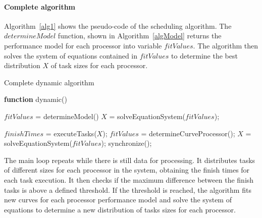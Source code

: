 \documentclass[journal]{IEEEtran}
\begin{document}
\vspace{0.2cm}
\paragraph*{Complete algorithm} 

Algorithm~\ref{alg1} shows the pseudo-code of the scheduling algorithm. The
$determineModel$ function, shown in Algorithm~\ref{algModel} returns the
performance model for each processor into variable $fitValues$. The algorithm
then solves the system of equations contained in $fitValues$ to determine the
best distribution $X$ of task sizes for each processor.

\begin{algorithm}

\caption{Complete dynamic algorithm}
\label{alg1}

\begin{algorithmic}		

\STATE \textbf{function} dynamic()

\STATE $fitValues$ = determineModel()
\STATE $X$ = solveEquationSystem($fitValues$);


	\STATE $finishTimes$ = executeTasks($X$);
		\STATE $fitValues$ = determineCurveProcessor();
                \STATE $X$ = solveEquationSystem($fitValues$);
                \STATE synchronize();
    	\ENDIF
\ENDWHILE

\end{algorithmic}
\end{algorithm}


The main loop repeats while there is still data for processing. It distributes
tasks of different sizes for each processor in the system, obtaining the finish
times for each task execution. It then checks if the maximum difference between
the finish tasks is above a defined threshold. If the threshold is reached, the
algorithm fits new curves for each processor performance model and solve the
system of equations to determine a new distribution of tasks sizes for each
processor.

\end{document}

